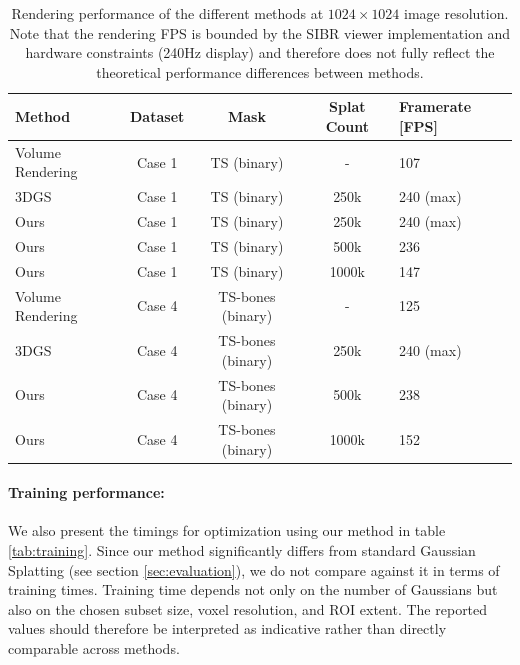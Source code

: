 \documentclass[runningheads]{llncs}
\begin{document}
\begin{table}
\centering
\caption{Rendering performance of the different methods at $1024 \times 1024$ image resolution. Note that the rendering FPS is bounded by the SIBR viewer implementation and hardware constraints (240Hz display) and therefore does not fully reflect the theoretical performance differences between methods.}\label{tab:fps}
\setlength{\tabcolsep}{4pt}
\renewcommand{\arraystretch}{1.1}
\begin{tabular}{|l|c|c|c|l|}
\hline
Method & Dataset & Mask & Splat Count & Framerate [FPS]\\
\hline
Volume Rendering    & Case 1  & TS (binary) & - & 107\\
3DGS                & Case 1  & TS (binary) & 250k & 240 (max) \\
Ours                & Case 1  & TS (binary) & 250k & 240 (max) \\
Ours                & Case 1  & TS (binary) & 500k & 236 \\
Ours                & Case 1  & TS (binary) & 1000k & 147 \\
Volume Rendering    & Case 4  & TS-bones (binary) & - & 125\\
3DGS                & Case 4  & TS-bones (binary) & 250k & 240 (max) \\
Ours                & Case 4  & TS-bones (binary) & 500k & 238 \\
Ours                & Case 4  & TS-bones (binary) & 1000k & 152 \\


\hline
\end{tabular}
\end{table}

\paragraph{Training performance:}
We also present the timings for optimization using our method in table \ref{tab:training}. Since our method significantly differs from standard Gaussian Splatting (see section \ref{sec:evaluation}), we do not compare against it in terms of training times.
Training time depends not only on the number of Gaussians but also on the chosen subset size, voxel resolution, and ROI extent. The reported values should therefore be interpreted as indicative rather than directly comparable across methods.
\end{document}
